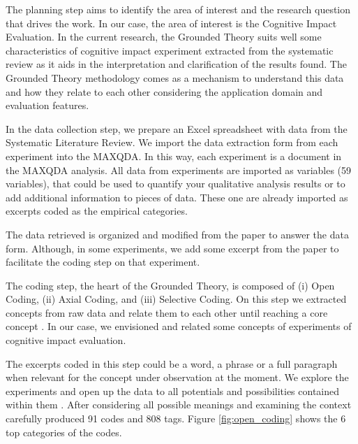 The planning step aims to identify the area of interest and the research question that drives the work. In our case, the area of interest is the Cognitive Impact Evaluation. In the current research, the Grounded Theory suits well some characteristics of cognitive impact experiment extracted from the systematic review as it aids in the interpretation and clarification of the results found. The Grounded Theory methodology comes as a mechanism to understand this data and how they relate to each other considering the application domain and evaluation features.




In the data collection step, we prepare an Excel spreadsheet with data from the Systematic Literature Review. We import the data extraction form from each experiment into the MAXQDA. In this way, each experiment is a document in the MAXQDA analysis. All data from experiments are imported as variables (59 variables), that could be used to quantify your qualitative analysis results or to add additional information to pieces of data. These one are already imported as excerpts coded as the empirical categories. 

The data retrieved is organized and modified from the paper to answer the data form. Although, in some experiments, we add some excerpt from the paper to facilitate the coding step on that experiment.

The coding step, the heart of the Grounded Theory, is composed of (i) Open Coding, (ii) Axial Coding, and (iii) Selective Coding. On this step we extracted concepts from raw data and relate them to each other until reaching a core concept \cite{Wuetherick2010}. In our case, we envisioned and related some concepts of experiments of cognitive impact evaluation.

The excerpts coded in this step could be a word, a phrase or a full paragraph when relevant for the concept under observation at the moment. We explore the experiments and open up the data to all potentials and possibilities contained within them \cite{Wuetherick2010}. After considering all possible meanings and examining the context carefully produced 91 codes and 808 tags. Figure \ref{fig:open_coding} shows the 6 top categories of the codes. 

